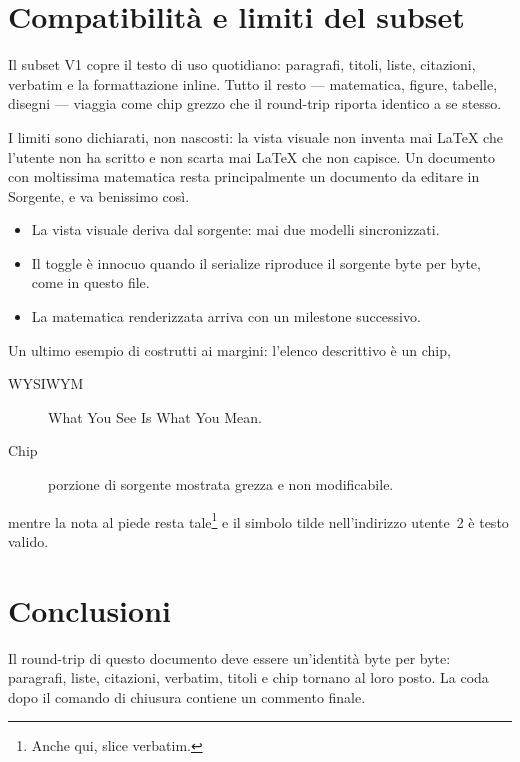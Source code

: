 \documentclass[a4paper,11pt]{article}
\begin{document}

\section{Compatibilità e limiti del subset}

Il subset V1 copre il testo di uso quotidiano: paragrafi, titoli, liste,
citazioni, verbatim e la formattazione inline. Tutto il resto — matematica,
figure, tabelle, disegni — viaggia come chip grezzo che il round-trip
riporta identico a se stesso.

I limiti sono dichiarati, non nascosti: la vista visuale non inventa mai
LaTeX che l'utente non ha scritto e non scarta mai LaTeX che non capisce.
Un documento con moltissima matematica resta principalmente un documento da
editare in Sorgente, e va benissimo così.

\begin{itemize}
  \item La vista visuale deriva dal sorgente: mai due modelli sincronizzati.
  \item Il toggle è innocuo quando il serialize riproduce il sorgente byte
    per byte, come in questo file.
  \item La matematica renderizzata arriva con un milestone successivo.
\end{itemize}

Un ultimo esempio di costrutti ai margini: l'elenco descrittivo è un chip,

\begin{description}
  \item[WYSIWYM] What You See Is What You Mean.
  \item[Chip] porzione di sorgente mostrata grezza e non modificabile.
\end{description}

mentre la nota al piede resta tale\footnote{Anche qui, slice verbatim.} e il
simbolo tilde nell'indirizzo utente~2 è testo valido.

\section{Conclusioni}

Il round-trip di questo documento deve essere un'identità byte per byte:
paragrafi, liste, citazioni, verbatim, titoli e chip tornano al loro posto.
La coda dopo il comando di chiusura contiene un commento finale.
\end{document}
